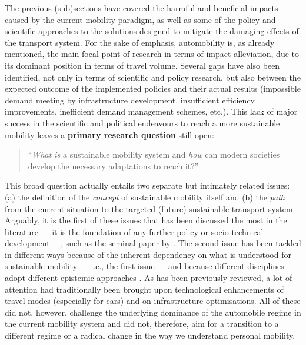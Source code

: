 The previous (sub)sections have covered the harmful and beneficial impacts caused by the current mobility paradigm, as well as some of the policy and scientific approaches to the solutions designed to mitigate the damaging effects of the transport system. For the sake of emphasis, automobility is, as already mentioned, the main focal point of research in terms of impact alleviation, due to its dominant position in terms of travel volume. Several gaps have also been identified, not only in terms of scientific and policy research, but also between the expected outcome of the implemented policies and their actual results (impossible demand meeting by infrastructure development, insufficient efficiency improvements, inefficient demand management schemes, etc.). This lack of major success in the scientific and political endeavours to reach a more sustainable mobility leaves a \textbf{primary research question} still open:
\blockquote{``\textit{What is} a sustainable mobility system and \textit{how} can modern societies develop the necessary adaptations to reach it?''}

This broad question actually entails two separate but intimately related issues: (a) the definition of the \textit{concept} of sustainable mobility itself and (b) the \textit{path} from the current situation to the targeted (future) sustainable transport system. Arguably, it is the first of these issues that has been discussed the most in the literature --- it is the foundation of any further policy or socio-technical development ---, such as the seminal paper by \textcite{banister2008_sustainablemobilityparadigm}. The second issue has been tackled in different ways because of the inherent dependency on what is understood for sustainable mobility --- i.e., the first issue --- and because different disciplines adopt different epistemic approaches \parencite{creutzig2015_EvolvingNarrativesLow}. As has been previously reviewed, a lot of attention had traditionally been brought upon technological enhancements of travel modes (especially for cars) and on infrastructure optimisations. All of these did not, however, challenge the underlying dominance of the automobile regime in the current mobility system and did not, therefore, aim for a transition to a different regime or a radical change in the way we understand personal mobility.

